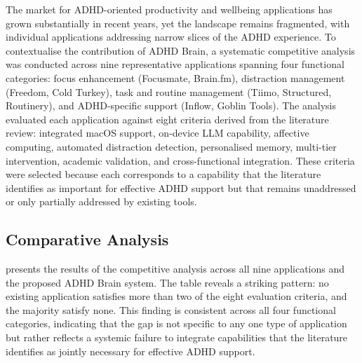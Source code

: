 The market for ADHD-oriented productivity and wellbeing applications has grown substantially in recent years, yet the landscape remains fragmented, with individual applications addressing narrow slices of the ADHD experience. To contextualise the contribution of ADHD Brain, a systematic competitive analysis was conducted across nine representative applications spanning four functional categories: focus enhancement (Focusmate, Brain.fm), distraction management (Freedom, Cold Turkey), task and routine management (Tiimo, Structured, Routinery), and ADHD-specific support (Inflow, Goblin Tools). The analysis evaluated each application against eight criteria derived from the literature review: integrated macOS support, on-device LLM capability, affective computing, automated distraction detection, personalised memory, multi-tier intervention, academic validation, and cross-functional integration. These criteria were selected because each corresponds to a capability that the literature identifies as important for effective ADHD support but that remains unaddressed or only partially addressed by existing tools.

\subsection{Comparative Analysis}
\label{sec:litrev_comparative}

 presents the results of the competitive analysis across all nine applications and the proposed ADHD Brain system. The table reveals a striking pattern: no existing application satisfies more than two of the eight evaluation criteria, and the majority satisfy none. This finding is consistent across all four functional categories, indicating that the gap is not specific to any one type of application but rather reflects a systemic failure to integrate capabilities that the literature identifies as jointly necessary for effective ADHD support.

